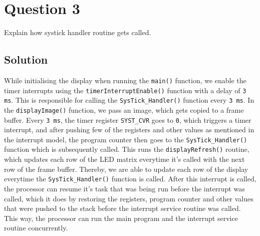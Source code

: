 \section*{Question 3}

Explain how systick handler routine gets called.

\subsection*{Solution}

While initialising the display when running the \texttt{main()} function, we enable the timer interrupts using the \texttt{timerInterruptEnable()} function with a delay of \texttt{3 ms}.
This is responsible for calling the \texttt{SysTick\_Handler()} function every \texttt{3 ms}.
In the \texttt{displayImage()} function, we pass an image, which gets copied to a frame buffer.
Every \texttt{3 ms}, the timer register \texttt{SYST\_CVR} goes to \texttt{0}, which triggers a timer interrupt, and after pushing few of the registers and other values as mentioned in the interrupt model, the program counter then goes to the \texttt{SysTick\_Handler()} function which is subsequently called.
This runs the \texttt{displayRefresh()} routine, which updates each row of the LED matrix everytime it's called with the next row of the frame buffer.
Thereby, we are able to update each row of the display everytime the \texttt{SysTick\_Handler()} function is called.
After this interrupt is called, the processor can resume it's task that was being run before the interrupt was called, which it does by restoring the registers, program counter and other values that were pushed to the stack before the interrupt service routine was called.
This way, the processor can run the main program and the interrupt service routine concurrently.
